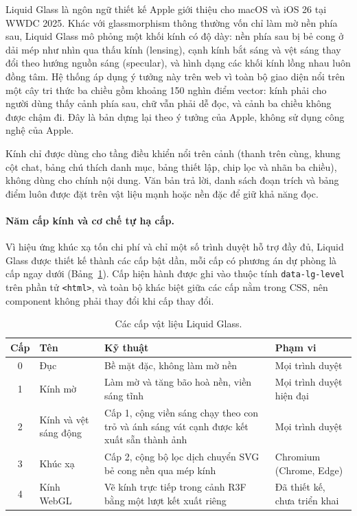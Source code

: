 Liquid Glass là ngôn ngữ thiết kế Apple giới thiệu cho macOS và iOS 26 tại WWDC 2025. Khác với glassmorphism thông thường vốn chỉ làm mờ nền phía sau, Liquid Glass mô phỏng một khối kính có độ dày: nền phía sau bị bẻ cong ở dải mép như nhìn qua thấu kính (lensing), cạnh kính bắt sáng và vệt sáng thay đổi theo hướng nguồn sáng (specular), và hình dạng các khối kính lồng nhau luôn đồng tâm. Hệ thống áp dụng ý tưởng này trên web vì toàn bộ giao diện nổi trên một cây tri thức ba chiều gồm khoảng 150 nghìn điểm vector: kính phải cho người dùng thấy cảnh phía sau, chữ vẫn phải dễ đọc, và cảnh ba chiều không được chậm đi. Đây là bản dựng lại theo ý tưởng của Apple, không sử dụng công nghệ của Apple.

Kính chỉ được dùng cho tầng điều khiển nổi trên cảnh (thanh trên cùng, khung cột chat, bảng chú thích danh mục, bảng thiết lập, chip lọc và nhãn ba chiều), không dùng cho chính nội dung. Văn bản trả lời, danh sách đoạn trích và bảng điểm luôn được đặt trên vật liệu mạnh hoặc nền đặc để giữ khả năng đọc.

\paragraph{Năm cấp kính và cơ chế tự hạ cấp.} Vì hiệu ứng khúc xạ tốn chi phí và chỉ một số trình duyệt hỗ trợ đầy đủ, Liquid Glass được thiết kế thành các cấp bật dần, mỗi cấp có phương án dự phòng là cấp ngay dưới (Bảng~\ref{tab:cap-liquid-glass}). Cấp hiện hành được ghi vào thuộc tính \texttt{data-lg-level} trên phần tử \texttt{<html>}, và toàn bộ khác biệt giữa các cấp nằm trong CSS, nên component không phải thay đổi khi cấp thay đổi.

\begin{table}[htbp]
    \centering
    \caption{Các cấp vật liệu Liquid Glass.}
    \label{tab:cap-liquid-glass}
    \small
    \begin{tabularx}{\textwidth}{@{}c>{\raggedright\arraybackslash}p{2.6cm}>{\raggedright\arraybackslash}X>{\raggedright\arraybackslash}p{2.8cm}@{}}
        \toprule
        \textbf{Cấp} & \textbf{Tên} & \textbf{Kỹ thuật} & \textbf{Phạm vi} \\
        \midrule
        0 & Đục & Bề mặt đặc, không làm mờ nền & Mọi trình duyệt \\
        1 & Kính mờ & Làm mờ và tăng bão hoà nền, viền sáng tĩnh & Mọi trình duyệt hiện đại \\
        2 & Kính và vệt sáng động & Cấp 1, cộng viền sáng chạy theo con trỏ và ánh sáng vát cạnh được kết xuất sẵn thành ảnh & Mọi trình duyệt \\
        3 & Khúc xạ & Cấp 2, cộng bộ lọc dịch chuyển SVG bẻ cong nền qua mép kính & Chromium (Chrome, Edge) \\
        4 & Kính WebGL & Vẽ kính trực tiếp trong cảnh R3F bằng một lượt kết xuất riêng & Đã thiết kế, chưa triển khai \\
        \bottomrule
    \end{tabularx}
\end{table}

